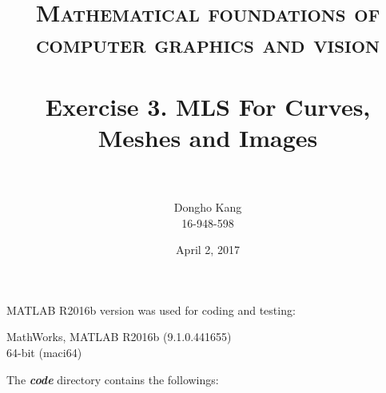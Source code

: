 \documentclass[paper=a4, fontsize=11pt]{scrartcl} %
\title{	
\normalfont \normalsize 
\textsc{Mathematical foundations of computer graphics and vision} \\ [25pt] %
\horrule{0.5pt} \\[0.4cm] %
\huge Exercise 3. MLS For Curves, Meshes and Images\\ %
\horrule{2pt} \\[0.5cm] %
}
\author{Dongho Kang \\ \small 16-948-598} %
\date{\normalsize April 2, 2017} %
\numberwithin{equation}{section} %
\numberwithin{figure}{section} %
\numberwithin{table}{section} %
\newcommand{\filename}[1]{\textbf{\textit{#1}}}
\begin{document}
\maketitle %


MATLAB R2016b version was used for coding and testing:

\begin{center}
MathWorks, MATLAB R2016b (9.1.0.441655) \\
64-bit (maci64) 
\end{center}

The \filename{code} directory contains the followings:
\end{document}
